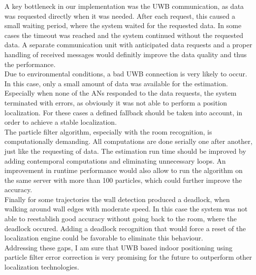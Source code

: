 A key bottleneck in our implementation was the UWB communication, as data was requested directly when it was needed. After each request, this caused a small waiting period, where the system waited for the requested data. In some cases the timeout was reached and the system continued without the requested data. A separate communication unit with anticipated data requests and a proper handling of received messages would definitly improve the data quality and thus the performance.\\
\noindent\hspace*{5mm}%
Due to environmental conditions, a bad UWB connection is very likely to occur. In this case, only a small amount of data was available for the estimation. Especially when none of the ANs responded to the data requests, the system terminated with errors, as obviously it was not able to perform a position localization. For these cases a defined fallback should be taken into account, in order to achieve a stable localization.\\
\noindent\hspace*{5mm}%
The particle filter algorithm, especially with the room recognition, is computationally demanding. All computations are done serially one after another, just like the requesting of data. The estimation run time should be improved by adding contemporal computations and eliminating unnecessary loops. An improvement in runtime performance would also allow to run the algorithm on the same server with more than 100 particles, which could further improve the accuracy.\\
\noindent\hspace*{5mm}%
Finally for some trajectories the wall detection produced a deadlock, when walking around wall edges with moderate speed. In this case the system was not able to reestablish good accuracy without going back to the room, where the deadlock occured. Adding a deadlock recognition that would force a reset of the localization engine could be favorable to eliminate this behaviour.\\
\noindent\hspace*{5mm}%
Addressing these gaps, I am sure that UWB based indoor positioning using particle filter error correction is very promising for the future to outperform other localization technologies.